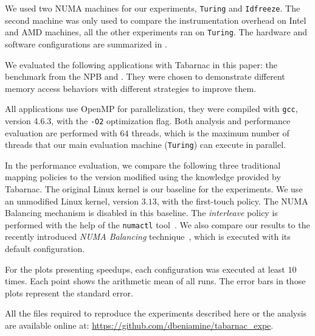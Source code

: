 We used two NUMA machines for our experiments, \texttt{Turing} and \texttt{Idfreeze}.
The second machine was only used to compare the instrumentation overhead on Intel and AMD machines, all the other experiments ran on \texttt{Turing}.
The hardware and software configurations are summarized in .

We evaluated the following applications with \gls{Tabarnac} in this paper: the \IS benchmark from the \gls{NPB} and \Ondes.
They were chosen to demonstrate different memory access behaviors with different strategies to improve them.

All applications use OpenMP for parallelization, they were compiled with \texttt{gcc}, version 4.6.3, with the \texttt{-O2} optimization flag.
Both analysis and performance evaluation are performed with $64$ threads, which is the maximum number of threads that our main evaluation machine (\texttt{Turing}) can execute in parallel.

In the performance evaluation, we compare the following three traditional mapping policies to the version modified using the knowledge provided by \gls{Tabarnac}.
The original \gls{Linux} kernel is our baseline for the experiments.
We use an unmodified Linux kernel, version $3.13$, with the first-touch policy.
The NUMA Balancing mechanism is disabled in this baseline.
The \emph{interleave} policy is performed with the help of the \texttt{numactl} tool~\cite{Kleen05NUMA}.
We also compare our results to the recently introduced \emph{NUMA Balancing} technique~\cite{Corbet12Toward}, which is executed with its default configuration.

For the plots presenting speedups, each configuration was executed at least $10$ times.
Each point shows the arithmetic mean of all runs.
The error bars in those plots represent the standard error.

All the files required to reproduce the experiments described here or the analysis are available online at: \url{https://github.com/dbeniamine/tabarnac\_expe}.

